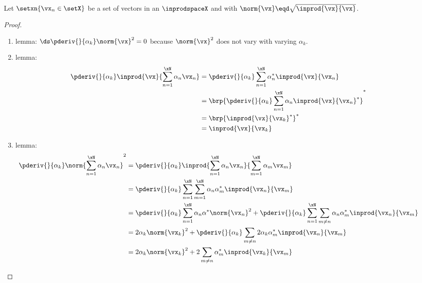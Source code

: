 \begin{theorem}
\label{thm:bat_frame}
Let $\setxn{\vx_n\in\setX}$ be a set of vectors in an   $\inprodspaceX$ and with
$\norm{\vx}\eqd\sqrt{\inprod{\vx}{\vx}}$.
\end{theorem}
\begin{proof}
\begin{enumerate}
  \item lemma: \label{ilem:batframe_normvx}
        $\ds\pderiv{}{\alpha_k} \norm{\vx}^2 = 0$ because $\norm{\vx}^2$ does not vary with varying $\alpha_k$.

  \item lemma: \label{ilem:batframe_inprod}
    \begin{align*}
      \pderiv{}{\alpha_k}\inprod{\vx}{\sum_{n=1}^\xN \alpha_{n} \vx_n}
        &= \pderiv{}{\alpha_k}\sum_{n=1}^\xN \alpha^\ast_{n}\inprod{\vx}{\vx_n}
      \\&= \brp{\pderiv{}{\alpha_k}\sum_{n=1}^\xN \alpha_{n}\inprod{\vx}{\vx_n}^\ast}^\ast
      \\&= \brp{\inprod{\vx}{\vx_k}^\ast}^\ast
      \\&= \inprod{\vx}{\vx_k}
    \end{align*}

  \item  lemma: \label{ilem:batframe_norm}
    \begin{align*}
      \pderiv{}{\alpha_k} \norm{\sum_{n=1}^\xN \alpha_{n} \vx_n}^2
        &= \pderiv{}{\alpha_k} \inprod{\sum_{n=1}^\xN \alpha_{n} \vx_n}{\sum_{m=1}^\xN \alpha_{m} \vx_m}
      \\&= \pderiv{}{\alpha_k} \sum_{n=1}^\xN \sum_{m=1}^\xN \alpha_{n}\alpha^\ast_{m}\inprod{\vx_n}{\vx_m}
      \\&= \pderiv{}{\alpha_k} \sum_{n=1}^\xN \alpha_{n}\alpha^\ast\norm{\vx_n}^2
         + \pderiv{}{\alpha_k} \sum_{n=1}^\xN \sum_{m\neq n} \alpha_{n}\alpha^\ast_{m} \inprod{\vx_n}{\vx_m}
      \\&= 2\alpha_{k}\norm{\vx_k}^2
         + \pderiv{}{\alpha_k} \sum_{m\neq n} 2\alpha_{k}\alpha^\ast_{m}\inprod{\vx_n}{\vx_m}
      \\&= 2\alpha_{k} \norm{\vx_k}^2
         + 2\sum_{m\neq n} \alpha^\ast_{m}\inprod{\vx_k}{\vx_m}
    \end{align*}


\end{enumerate}
\end{proof}
